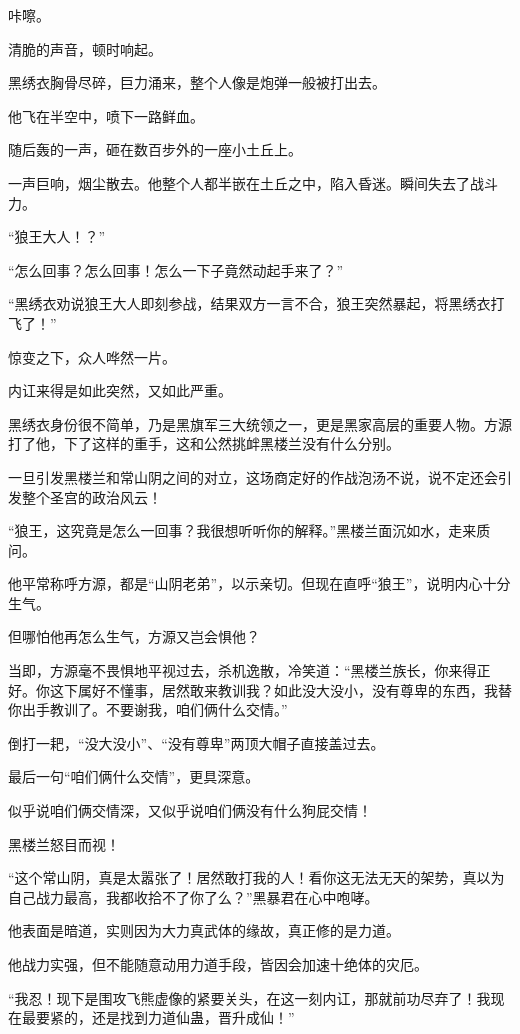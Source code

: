 \begin{this_body}
咔嚓。

清脆的声音，顿时响起。

黑绣衣胸骨尽碎，巨力涌来，整个人像是炮弹一般被打出去。

他飞在半空中，喷下一路鲜血。

随后轰的一声，砸在数百步外的一座小土丘上。

一声巨响，烟尘散去。他整个人都半嵌在土丘之中，陷入昏迷。瞬间失去了战斗力。

“狼王大人！？”

“怎么回事？怎么回事！怎么一下子竟然动起手来了？”

“黑绣衣劝说狼王大人即刻参战，结果双方一言不合，狼王突然暴起，将黑绣衣打飞了！”

惊变之下，众人哗然一片。

内讧来得是如此突然，又如此严重。

黑绣衣身份很不简单，乃是黑旗军三大统领之一，更是黑家高层的重要人物。方源打了他，下了这样的重手，这和公然挑衅黑楼兰没有什么分别。

一旦引发黑楼兰和常山阴之间的对立，这场商定好的作战泡汤不说，说不定还会引发整个圣宫的政治风云！

“狼王，这究竟是怎么一回事？我很想听听你的解释。”黑楼兰面沉如水，走来质问。

他平常称呼方源，都是“山阴老弟”，以示亲切。但现在直呼“狼王”，说明内心十分生气。

但哪怕他再怎么生气，方源又岂会惧他？

当即，方源毫不畏惧地平视过去，杀机逸散，冷笑道：“黑楼兰族长，你来得正好。你这下属好不懂事，居然敢来教训我？如此没大没小，没有尊卑的东西，我替你出手教训了。不要谢我，咱们俩什么交情。”

倒打一耙，“没大没小”、“没有尊卑”两顶大帽子直接盖过去。

最后一句“咱们俩什么交情”，更具深意。

似乎说咱们俩交情深，又似乎说咱们俩没有什么狗屁交情！

黑楼兰怒目而视！

“这个常山阴，真是太嚣张了！居然敢打我的人！看你这无法无天的架势，真以为自己战力最高，我都收拾不了你了么？”黑暴君在心中咆哮。

他表面是暗道，实则因为大力真武体的缘故，真正修的是力道。

他战力实强，但不能随意动用力道手段，皆因会加速十绝体的灾厄。

“我忍！现下是围攻飞熊虚像的紧要关头，在这一刻内讧，那就前功尽弃了！我现在最要紧的，还是找到力道仙蛊，晋升成仙！”


\end{this_body}
